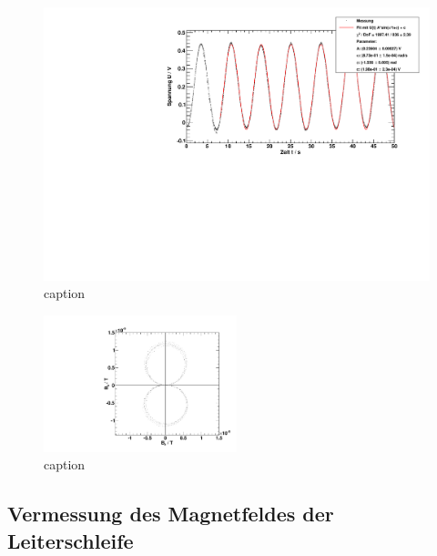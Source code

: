 \begin{figure}[H]
\begin{center}
  \includegraphics[width=\textwidth]{../img/fit_Spule_R1.pdf}
  \caption{caption}
  \label{img:ex:fit}
\end{center}
\end{figure}
\begin{figure}[H]
\begin{center}
  \includegraphics[width=0.5\textwidth]{../img/polar_Spule_R1.pdf}
  \caption{caption}
  \label{img:ex:polar}
\end{center}
\end{figure}

\subsection{Vermessung des Magnetfeldes der Leiterschleife}

